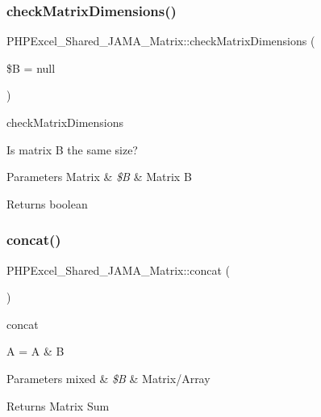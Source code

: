 \subsubsection{\texorpdfstring{check\+Matrix\+Dimensions()}{checkMatrixDimensions()}}
{\footnotesize\ttfamily P\+H\+P\+Excel\+\_\+\+Shared\+\_\+\+J\+A\+M\+A\+\_\+\+Matrix\+::check\+Matrix\+Dimensions (\begin{DoxyParamCaption}\item[{}]{\$B = {\ttfamily null} }\end{DoxyParamCaption})}

check\+Matrix\+Dimensions

Is matrix B the same size? 
\begin{DoxyParams}[1]{Parameters}
Matrix & {\em \$B} & Matrix B \\
\hline
\end{DoxyParams}
\begin{DoxyReturn}{Returns}
boolean 
\end{DoxyReturn}
\mbox{\label{classPHPExcel__Shared__JAMA__Matrix_a958fae736b507fbaf55625d998229fff}} 
\subsubsection{\texorpdfstring{concat()}{concat()}}
{\footnotesize\ttfamily P\+H\+P\+Excel\+\_\+\+Shared\+\_\+\+J\+A\+M\+A\+\_\+\+Matrix\+::concat (\begin{DoxyParamCaption}{ }\end{DoxyParamCaption})}

concat

A = A \& B 
\begin{DoxyParams}[1]{Parameters}
mixed & {\em \$B} & Matrix/\+Array \\
\hline
\end{DoxyParams}
\begin{DoxyReturn}{Returns}
Matrix Sum 
\end{DoxyReturn}
\mbox{\label{classPHPExcel__Shared__JAMA__Matrix_adceef7c6708da7d5cb634dbc76bb0cc1}} 
